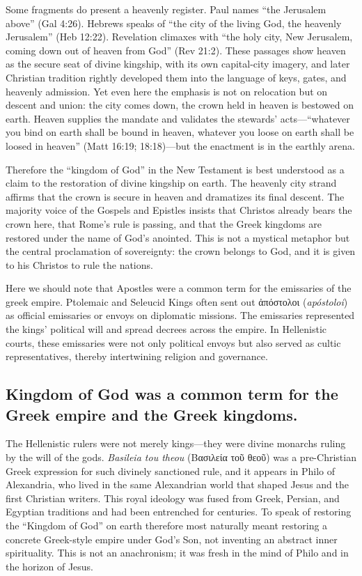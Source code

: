 Some fragments do present a heavenly register.
Paul names “the Jerusalem above” (Gal 4:26).
Hebrews speaks of “the city of the living God, the heavenly Jerusalem” (Heb 12:22).
Revelation climaxes with “the holy city, New Jerusalem, coming down out of heaven from God” (Rev 21:2).
These passages show heaven as the secure seat of divine kingship, with its own capital-city imagery, and later Christian tradition rightly developed them into the language of keys, gates, and heavenly admission.
Yet even here the emphasis is not on relocation but on descent and union: the city comes down, the crown held in heaven is bestowed on earth.
Heaven supplies the mandate and validates the stewards’ acts---“whatever you bind on earth shall be bound in heaven, whatever you loose on earth shall be loosed in heaven” (Matt 16:19; 18:18)---but the enactment is in the earthly arena.

Therefore the “kingdom of God” in the New Testament is best understood as a claim to the restoration of divine kingship on earth.
The heavenly city strand affirms that the crown is secure in heaven and dramatizes its final descent.
The majority voice of the Gospels and Epistles insists that Christos already bears the crown here, that Rome’s rule is passing, and that the Greek kingdoms are restored under the name of God’s anointed.
This is not a mystical metaphor but the central proclamation of sovereignty: the crown belongs to God, and it is given to his Christos to rule the nations.

Here we should note that Apostles were a common term for the emissaries of the greek empire.
Ptolemaic and Seleucid Kings often sent out ἀπόστολοι (\textit{apóstoloi}) as official emissaries or envoys on diplomatic missions.
The emissaries represented the kings’ political will and spread decrees across the empire.
In Hellenistic courts, these emissaries were not only political envoys but also served as cultic representatives, thereby intertwining religion and governance.

\subsection{Kingdom of God was a common term for the Greek empire and the Greek kingdoms.}\label{subsec:kingdom-of-god-was-a-common-term-for-the-greek-empire-and-the-greek-kingdoms.}

The Hellenistic rulers were not merely kings---they were divine monarchs ruling by the will of the gods.
\emph{Basileia tou theou} (Βασιλεία τοῦ θεοῦ) was a pre-Christian Greek expression for such divinely sanctioned rule, and it appears in Philo of Alexandria, who lived in the same Alexandrian world that shaped Jesus and the first Christian writers.
This royal ideology was fused from Greek, Persian, and Egyptian traditions and had been entrenched for centuries.
To speak of restoring the ``Kingdom of God'' on earth therefore most naturally meant restoring a concrete Greek-style empire under God’s Son, not inventing an abstract inner spirituality.
This is not an anachronism; it was fresh in the mind of Philo and in the horizon of Jesus.

